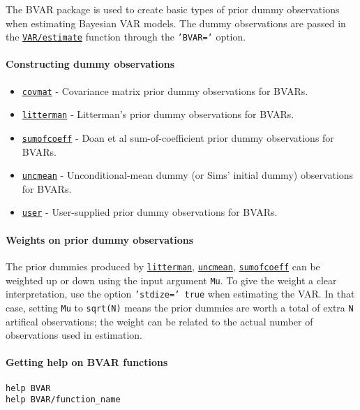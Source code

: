 

	The BVAR package is used to create basic types of prior dummy
observations when estimating Bayesian VAR models. The dummy observations
are passed in the \href{VAR/estimate}{\texttt{VAR/estimate}} function
through the \texttt{'BVAR='} option.

\paragraph{Constructing dummy
observations}

\begin{itemize}
\itemsep1pt\parskip0pt
\item
  \href{BVAR/covmat}{\texttt{covmat}} - Covariance matrix prior dummy
  observations for BVARs.
\item
  \href{BVAR/litterman}{\texttt{litterman}} - Litterman's prior dummy
  observations for BVARs.
\item
  \href{BVAR/sumofcoeff}{\texttt{sumofcoeff}} - Doan et al
  sum-of-coefficient prior dummy observations for BVARs.
\item
  \href{BVAR/uncmean}{\texttt{uncmean}} - Unconditional-mean dummy (or
  Sims' initial dummy) observations for BVARs.
\item
  \href{BVAR/user}{\texttt{user}} - User-supplied prior dummy
  observations for BVARs.
\end{itemize}

\paragraph{Weights on prior dummy
observations}

The prior dummies produced by \href{BVAR/litterman}{\texttt{litterman}},
\href{BVAR/uncmean}{\texttt{uncmean}},
\href{BVAR/sumofcoeff}{\texttt{sumofcoeff}} can be weighted up or down
using the input argument \texttt{Mu}. To give the weight a clear
interpretation, use the option \texttt{'stdize=' true} when estimating
the VAR. In that case, setting \texttt{Mu} to \texttt{sqrt(N)} means the
prior dummies are worth a total of extra \texttt{N} artifical
observations; the weight can be related to the actual number of
observations used in estimation.

\paragraph{Getting help on BVAR
functions}

\begin{verbatim}
help BVAR
help BVAR/function_name
\end{verbatim}



